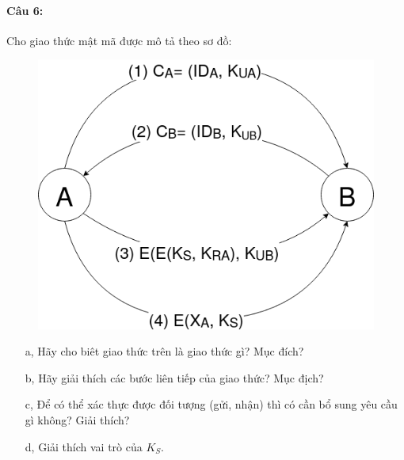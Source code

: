 \documentclass[paper=a4, fontsize=11pt]{scrartcl}
\numberwithin{equation}{section}		%
\numberwithin{figure}{section}			%
\numberwithin{table}{section}				%
\begin{document}
	\paragraph{Câu 6:} Cho giao thức mật mã được mô tả theo sơ đồ:
	\begin{figure}[H]
		\centering
		\includegraphics[width=0.7\linewidth]{SoDoBMTT}
		\label{fig:sodobmtt}
	\end{figure}
	
	\begin{itemize}
		\item[a,] Hãy cho biêt giao thức trên là giao thức gì? Mục đích?
		\item[b,] Hãy giải thích các bước liên tiếp của giao thức? Mục địch?
		\item[c,] Để có thể xác thực được đối tượng (gửi, nhận) thì có cần bổ sung yêu cầu gì không? Giải thích?
		\item[d,] Giải thích vai trò của $K_S$.
	\end{itemize}
	
\end{document}
